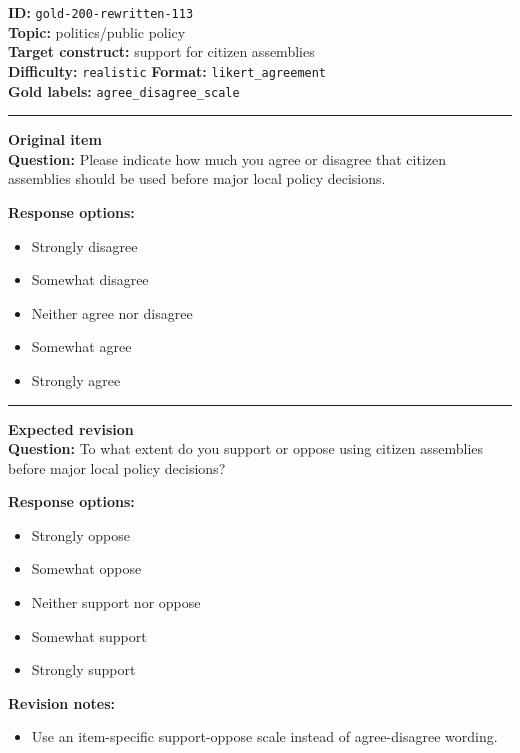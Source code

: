 \documentclass[10pt,a4paper]{article}
\newcommand{\sectionline}{\vspace{0.15em}\hrule\vspace{0.35em}}
\begin{document}
\begin{tcolorbox}[colframe=FlawRed,colback=white,colbacktitle=FlawRed!9,coltitle=black,title={Item 113\hfill Flawed item}]
\textbf{ID:} \texttt{gold-200-rewritten-113}\\
\textbf{Topic:} politics/public policy\\
\textbf{Target construct:} support for citizen assemblies\\
\textbf{Difficulty:} \texttt{realistic} \quad \textbf{Format:} \texttt{likert\_agreement}\\
\textbf{Gold labels:} \texttt{agree\_disagree\_scale}\\
\sectionline
\textbf{Original item}\\
\textbf{Question:} Please indicate how much you agree or disagree that citizen assemblies should be used before major local policy decisions.
\par\textbf{Response options:}
\begin{itemize}
\item Strongly disagree
\item Somewhat disagree
\item Neither agree nor disagree
\item Somewhat agree
\item Strongly agree
\end{itemize}
\sectionline
\textbf{Expected revision}\\
\textbf{Question:} To what extent do you support or oppose using citizen assemblies before major local policy decisions?
\par\textbf{Response options:}
\begin{itemize}
\item Strongly oppose
\item Somewhat oppose
\item Neither support nor oppose
\item Somewhat support
\item Strongly support
\end{itemize}
\par\textbf{Revision notes:}
\begin{itemize}
\item Use an item-specific support-oppose scale instead of agree-disagree wording.
\end{itemize}
\end{tcolorbox}
\end{document}
